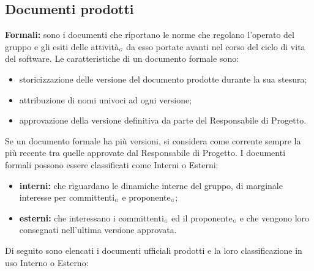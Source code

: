 \subsection{Documenti prodotti}\label{ProcessiDiSupportoDocumentazioneDocumentiProdotti}
	 \textbf{Formali:} sono i documenti che riportano le norme che regolano l’operato del gruppo e gli esiti delle attività$_{\scaleto{G}{3pt}}$ da esso portate avanti nel corso del ciclo di vita del software. Le caratteristiche di un documento formale sono:
\begin{itemize}
\item storicizzazione delle versione del documento prodotte durante la sua stesura;
	\item attribuzione di nomi univoci ad ogni versione;
		\item approvazione della versione definitiva da parte del Responsabile di Progetto.
\end{itemize}
Se un documento formale ha più versioni, si considera come corrente sempre la più recente tra quelle approvate dal Responsabile di Progetto. I documenti formali possono essere classificati come Interni o Esterni:
\begin{itemize}
\item \textbf {interni:} che riguardano le dinamiche interne del gruppo, di marginale interesse per committenti$_{\scaleto{G}{3pt}}$ e proponente$_{\scaleto{G}{3pt}}$;
	\item \textbf {esterni:}  che interessano i committenti$_{\scaleto{G}{3pt}}$ ed il proponente$_{\scaleto{G}{3pt}}$ e che vengono loro consegnati nell’ultima versione approvata.
\end{itemize}
Di seguito sono elencati i documenti ufficiali prodotti e la loro classificazione in uso Interno o Esterno:
